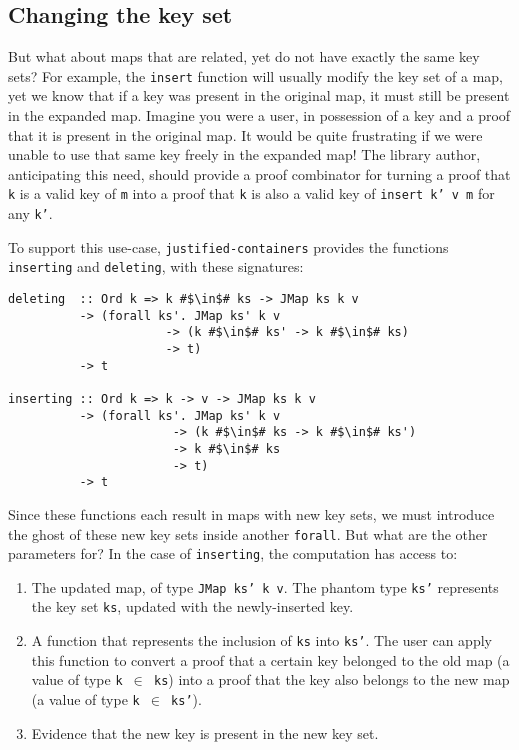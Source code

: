 \documentclass[format=sigplan, review=false, screen=true]{acmart}
\begin{document}
\subsection{Changing the key set}\label{changing-keys}
But what about maps that are related, yet do not have exactly the same key sets?
For example, the \texttt{insert} function will usually modify the key set of a map,
yet we know that if a key was present in the original map, it must still be present
in the expanded map. Imagine you were a user, in possession of a key and a proof
that it is present in the original map. It would be quite frustrating if  we were
unable to use that same key freely in the expanded map!
The library author, anticipating this need, should provide a proof combinator for
turning a proof that \texttt{k} is a valid key of \texttt{m} into a proof that
\texttt{k} is also a valid key of \texttt{insert k' v m} for any \texttt{k'}.

To support this use-case, \texttt{justified-containers} provides the functions
\texttt{inserting} and \texttt{deleting}, with these signatures:
\begin{verbatim}
deleting  :: Ord k => k #$\in$# ks -> JMap ks k v
          -> (forall ks'. JMap ks' k v
                      -> (k #$\in$# ks' -> k #$\in$# ks)
                      -> t)
          -> t

inserting :: Ord k => k -> v -> JMap ks k v
          -> (forall ks'. JMap ks' k v
                       -> (k #$\in$# ks -> k #$\in$# ks')
                       -> k #$\in$# ks
                       -> t)
          -> t
\end{verbatim}
Since these functions each result in maps with new key sets, we must
introduce the ghost of these new key sets inside another \texttt{forall}.
But what are the other parameters for? In the case of \texttt{inserting},
the computation has access to:
\begin{enumerate}
\item The updated map, of type \texttt{JMap ks' k v}. The phantom type \texttt{ks'}
  represents the key set \texttt{ks}, updated with the newly-inserted key.
\item A function that represents the inclusion of \texttt{ks} into \texttt{ks'}.
  The user can apply this function to convert a proof that a certain key belonged to the
  old map (a value of type \texttt{k $\in$ ks}) into a proof that the key also belongs to the new map (a value of type \texttt{k $\in$ ks'}).
\item Evidence that the new key is present in the new key set.
\end{enumerate}
\end{document}
